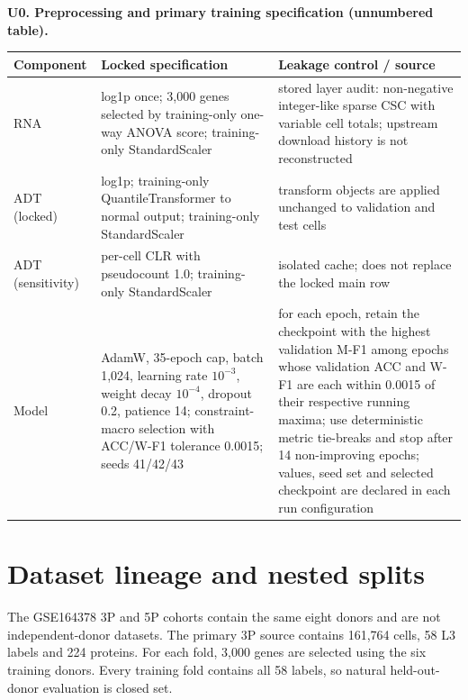 \documentclass[10pt]{article}
\begin{document}
\begin{center}
\textbf{U0. Preprocessing and primary training specification (unnumbered table).}

\scriptsize
\setlength{\tabcolsep}{3pt}
\begin{tabularx}{\textwidth}{>{\raggedright\arraybackslash}p{1.5cm} >{\raggedright\arraybackslash}p{5.0cm} X}
\toprule
Component & Locked specification & Leakage control / source \\
\midrule
RNA & log1p once; 3,000 genes selected by training-only one-way ANOVA score; training-only StandardScaler & stored layer audit: non-negative integer-like sparse CSC with variable cell totals; upstream download history is not reconstructed \\
ADT (locked) & log1p; training-only QuantileTransformer to normal output; training-only StandardScaler & transform objects are applied unchanged to validation and test cells \\
ADT (sensitivity) & per-cell CLR with pseudocount 1.0; training-only StandardScaler & isolated cache; does not replace the locked main row \\
Model & AdamW, 35-epoch cap, batch 1,024, learning rate $10^{-3}$, weight decay $10^{-4}$, dropout 0.2, patience 14; constraint-macro selection with ACC/W-F1 tolerance 0.0015; seeds 41/42/43 & for each epoch, retain the checkpoint with the highest validation M-F1 among epochs whose validation ACC and W-F1 are each within 0.0015 of their respective running maxima; use deterministic metric tie-breaks and stop after 14 non-improving epochs; values, seed set and selected checkpoint are declared in each run configuration \\
\bottomrule
\end{tabularx}
\end{center}

\section{Dataset lineage and nested splits}

The GSE164378 3P and 5P cohorts contain the same eight donors and are not independent-donor datasets. The primary 3P source contains 161,764 cells, 58 L3 labels and 224 proteins. For each fold, 3,000 genes are selected using the six training donors. Every training fold contains all 58 labels, so natural held-out-donor evaluation is closed set.
\end{document}
